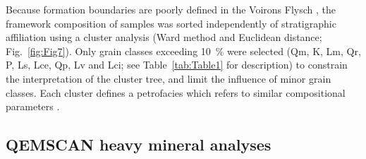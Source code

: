 \documentclass[twoside]{article}
\begin{document}
Because formation boundaries are poorly defined in the Voirons Flysch \citep{Stuijvenberg1980a,Stuijvenberg1980b,Vial1989,Coppo1999}, the framework composition of samples was sorted independently of stratigraphic affiliation using a cluster analysis (Ward method and Euclidean distance; Fig.~\ref{fig:Fig7}). Only grain classes exceeding 10~\% were selected (Qm, K, Lm, Qr, P, Ls, Lce, Qp, Lv and Lci; see Table~\ref{tab:Table1} for description) to constrain the interpretation of the cluster tree, and limit the influence of minor grain classes. Each cluster defines a petrofacies which refers to similar compositional parameters \citep{Dickinson1972}.

	

\subsection{QEMSCAN heavy mineral analyses}
\end{document}
